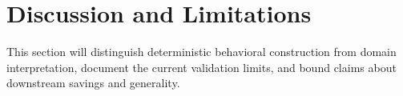 \section{Discussion and Limitations}

This section will distinguish deterministic behavioral construction from domain interpretation, document the current validation limits, and bound claims about downstream savings and generality.
